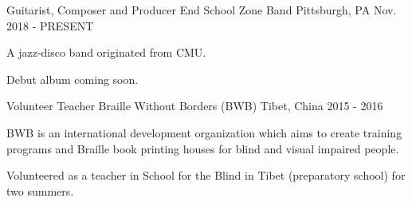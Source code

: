 

\begin{cventries}

  \cventry
    {Guitarist, Composer and Producer} %
    {End School Zone Band} %
    {Pittsburgh, PA} %
    {Nov. 2018 - PRESENT} %
    {
      \begin{cvitems} %
        \item {A jazz-disco band originated from CMU.}
        \item {Debut album coming soon.}
      \end{cvitems}
    }

  \cventry
    {Volunteer Teacher} %
    {Braille Without Borders (BWB)} %
    {Tibet, China} %
    {2015 - 2016} %
    {
      \begin{cvitems} %
        \item {BWB is an international development organization which aims to create training programs and Braille book printing houses for blind and visual impaired people.}
        \item {Volunteered as a teacher in School for the Blind in Tibet (preparatory school) for two summers.}
      \end{cvitems}
    }

\end{cventries}
